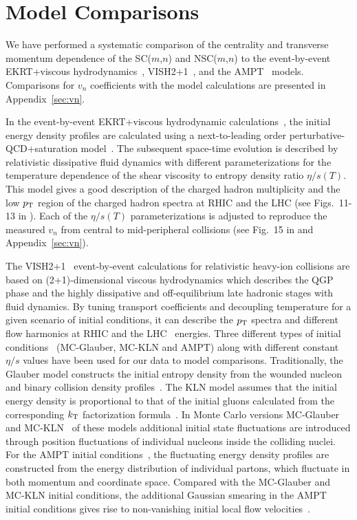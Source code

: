 \section{Model Comparisons}
\label{sec:theory}
We have performed a systematic comparison of the centrality and transverse momentum dependence of the SC($m$,$n$) and NSC($m$,$n$) to the event-by-event  EKRT+viscous hydrodynamics~\cite{Niemi:2015qia}, VISH2+1~\cite{Shen:2010uy,Shen:2014vra}, and the AMPT~\cite{Qian:2016pau,Lin:2004en,Lin:2014tya} models. Comparisons for $v_n$ coefficients with the model calculations are presented in Appendix~\ref{sec:vn}.

In the event-by-event EKRT+viscous hydrodynamic calculations~\cite{Niemi:2015qia}, the initial energy density profiles are calculated using a next-to-leading order perturbative-QCD+saturation model~\cite{Paatelainen:2012at,Paatelainen:2013eea}. The subsequent space-time evolution is described by relativistic dissipative fluid dynamics with different parameterizations for the temperature dependence of the shear viscosity to entropy density ratio $\eta/s(T)$. 
This model gives a good description of the charged hadron multiplicity and the low $p_{\rm T}$ region of the charged hadron spectra at RHIC and the LHC (see Figs.~11-13 in \cite{Niemi:2015qia}).
Each of the $\eta/s(T)$ parameterizations is adjusted to reproduce the measured $v_n$ from central to mid-peripheral collisions (see Fig.~15 in \cite{Niemi:2015qia} and Appendix~\ref{sec:vn}). 

The VISH2+1~\cite{Shen:2010uy,Shen:2014vra} event-by-event calculations for relativistic heavy-ion collisions are based on (2+1)-dimensional viscous hydrodynamics which describes the QGP phase and the highly dissipative and off-equilibrium late hadronic stages with fluid dynamics. By tuning transport coefficients and decoupling temperature for a given scenario of initial conditions, it can describe the $p_{\rm T}$ spectra and different flow harmonics at RHIC and the LHC~\cite{Qiu:2011hf, Shen:2010uy, Shen:2011eg, Bhalerao:2015iya} energies.
Three different types of initial conditions~\cite{Zhu:2016puf} ({MC-Glauber}, {MC-KLN} and {AMPT}) along with different constant $\eta/s$ values have been used for our data to model comparisons.
Traditionally, the Glauber model constructs the initial entropy density from the wounded nucleon and binary collision density profiles~\cite{Kolb:2000sd}. The {KLN} model assumes that the initial energy density is proportional to that of the initial gluons calculated from the corresponding $k_{\rm T}$ factorization formula~\cite{Kharzeev:2000ph}.
In Monte Carlo versions {MC-Glauber} and {MC-KLN}~\cite{Miller:2007ri,Drescher:2006ca,Hirano:2009ah} of these models additional initial state fluctuations are introduced through position fluctuations of individual nucleons inside the colliding nuclei. For the {AMPT} initial conditions~\cite{Bhalerao:2015iya,Pang:2012he,Xu:2016hmp}, the fluctuating energy density profiles are constructed from the energy distribution of individual partons, which fluctuate in both momentum and coordinate space. Compared with the {MC-Glauber} and {MC-KLN} initial conditions, the additional Gaussian smearing in the {AMPT} initial conditions gives rise to non-vanishing initial local flow velocities~\cite{Pang:2012he}. 

